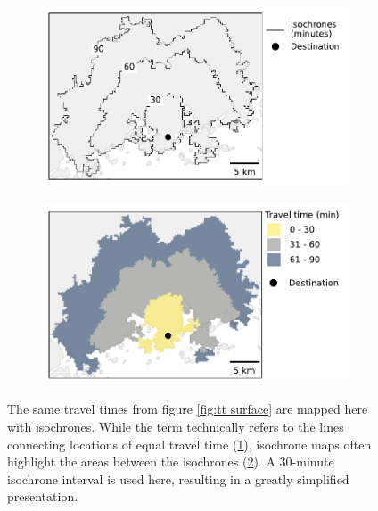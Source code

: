 \begin{figure}[H]
	\centering
	\begin{subfigure}[b]{0.55\textwidth}
		\includegraphics[width=\textwidth]{visual/figures/ttm/isochrone_lines}
		\caption{}
		\label{fig:isochrone lines}
		\hfill
	\end{subfigure}
	\begin{subfigure}[b]{0.55\textwidth}
		\includegraphics[width=\textwidth]{visual/figures/ttm/isochrone_areas}
		\caption{}
		\label{fig:isochrone areas}
		\hfill
	\end{subfigure}
	\caption{
		The same travel times from figure \ref{fig:tt surface}
		are mapped here with isochrones.
		While the term technically refers to the
		lines connecting locations of equal travel time (\ref{fig:isochrone lines}),
		isochrone maps often highlight the areas between the isochrones (\ref{fig:isochrone areas}).
		A 30-minute isochrone interval is used here, resulting in a greatly simplified presentation.
	}
	\label{fig:isochrones}
\end{figure}

